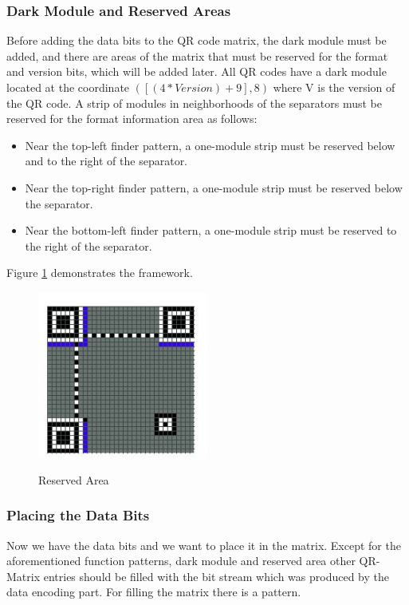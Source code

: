 \subsubsection{Dark Module and Reserved Areas}

Before adding the data bits to the QR code matrix, the dark module must be added, and there are areas of the matrix that must be reserved for the format and version bits, which will be added later. All QR codes have a dark module located at the coordinate $([(4 * Version) + 9], 8)$ where V is the version of the QR code. A strip of modules in neighborhoods of the separators must be reserved for the format information area as follows:
\begin{itemize}
\item Near the top-left finder pattern, a one-module strip must be reserved below and to the right of the separator.
\item Near the top-right finder pattern, a one-module strip must be reserved below the separator.
\item Near the bottom-left finder pattern, a one-module strip must be reserved to the right of the separator.
\end{itemize}


Figure \ref{fig:27} demonstrates the framework.
\begin{figure}[H]
  \caption{Reserved Area\cite{Thonky}}
  \centering
    \includegraphics[width=0.5\textwidth]{figures/ReservedArea.jpg}
    \label{fig:27}
\end{figure}

\subsubsection{Placing the Data Bits}

Now we have the data bits and we want to place it in the matrix. Except for the aforementioned function patterns, dark module and reserved area other QR-Matrix entries should be filled with the bit stream which was produced by the data encoding part.
For filling the matrix there is a pattern. 

